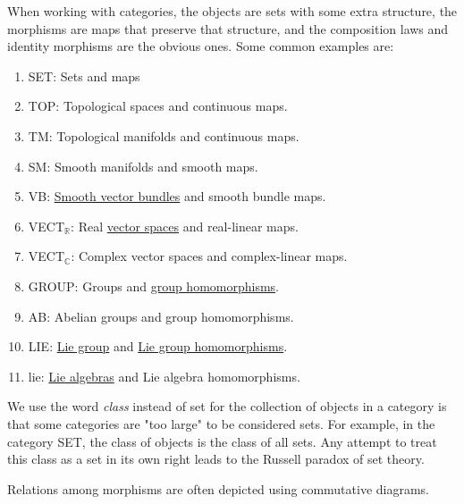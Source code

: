 \documentclass{article}
\newcounter{example}[section]
\begin{document}
    \begin{example}[Categories]
      \label{ex:categories}
    When working with categories, the objects are sets with some extra structure, the morphisms are maps that preserve that structure, and the composition laws and identity morphisms are the obvious ones. Some common examples are: 
    \begin{enumerate}
        \item SET: Sets and maps 
        \item TOP: Topological spaces and continuous maps. 
        \item TM: Topological manifolds and continuous maps. 
        \item SM: Smooth manifolds and smooth maps. 
        \item VB: \hyperref[def:smooth-vector-bundle]{Smooth vector bundles} and smooth bundle maps. 
        \item VECT$_\mathbb{R}$: Real \hyperref[lin-def:vector-space]{vector spaces} and real-linear maps. 
        \item VECT$_\mathbb{C}$: Complex vector spaces and complex-linear maps. 
        \item GROUP: Groups and \hyperref[alg-def:group-homomorphism]{group homomorphisms}. 
        \item AB: Abelian groups and group homomorphisms. \item LIE: \hyperref[def:lie-group]{Lie group} and \hyperref[def:lie-group-homomorphism]{Lie group homomorphisms}. 
        \item lie: \hyperref[def:lie-algebra]{Lie algebras} and Lie algebra homomorphisms. 
    \end{enumerate}
    \end{example}

    We use the word \textit{class} instead of set for the collection of objects in a category is that some categories are "too large" to be considered sets. For example, in the category SET, the class of objects is the class of all sets. Any attempt to treat this class as a set in its own right leads to the Russell paradox of set theory. 

    Relations among morphisms are often depicted using commutative diagrams. 
\end{document}
